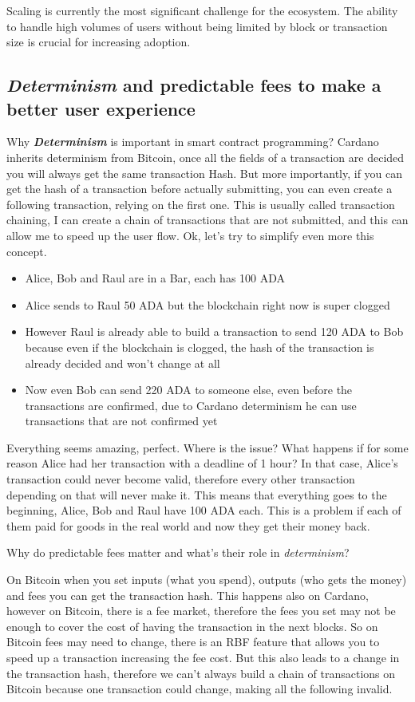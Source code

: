 Scaling is currently the most significant challenge for the ecosystem. The ability to handle high volumes of users without being limited by block or transaction size is crucial for increasing adoption.

\subsection{\textit{Determinism} and predictable fees to make a better user experience}
Why \textbf{\textit{Determinism}} is important in smart contract programming?
Cardano inherits determinism from Bitcoin, once all the fields of a transaction are decided you will always get the same transaction Hash.
But more importantly, if you can get the hash of a transaction before actually submitting, you can even create a following transaction, relying on the first one.
This is usually called transaction chaining, I can create a chain of transactions that are not submitted, and this can allow me to speed up the user flow.
Ok, let's try to simplify even more this concept.
\begin{itemize}
  \item Alice, Bob and Raul are in a Bar, each has 100 ADA
  \item Alice sends to Raul 50 ADA but the blockchain right now is super clogged
  \item However Raul is already able to build a transaction to send 120 ADA to Bob because even if the blockchain is clogged, the hash of the transaction is already decided and won't change at all
  \item Now even Bob can send 220 ADA to someone else, even before the transactions are confirmed, due to Cardano determinism he can use transactions that are not confirmed yet
\end{itemize}

Everything seems amazing, perfect. Where is the issue?
What happens if for some reason Alice had her transaction with a deadline of 1 hour?
In that case, Alice's transaction could never become valid, therefore every other transaction depending on that will never make it.
This means that everything goes to the beginning, Alice, Bob and Raul have 100 ADA each. This is a problem if each of them paid for goods in the real world and now they get their money back.

Why do predictable fees matter and what's their role in \textit{determinism}?

On Bitcoin when you set inputs (what you spend), outputs (who gets the money) and fees you can get the transaction hash.
This happens also on Cardano, however on Bitcoin, there is a fee market, therefore the fees you set may not be enough to cover the cost of having the transaction in the next blocks.
So on Bitcoin fees may need to change, there is an RBF feature that allows you to speed up a transaction increasing the fee cost.
But this also leads to a change in the transaction hash, therefore we can't always build a chain of transactions on Bitcoin because one transaction could change, making all the following invalid.

